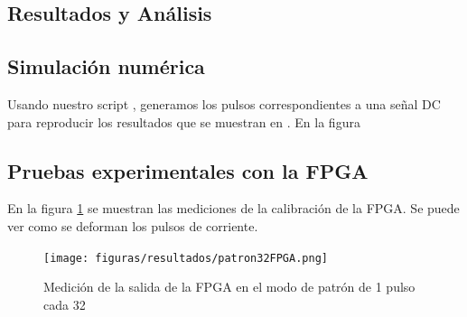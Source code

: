 \documentclass[twoside]{article}
\begin{document}
\begin{multicols}{2}
\section{Resultados y Análisis}

    \subsection{Simulación numérica}

    Usando nuestro script \cite{script}, generamos los pulsos correspondientes a una señal DC para reproducir los resultados que se muestran en \cite{aziz1996}. En la figura 

    \subsection{Pruebas experimentales con la FPGA}

    En la figura \ref{fig:resultados_patron32FPGA} se muestran las mediciones de la calibración de la FPGA. Se puede ver como se deforman los pulsos de corriente.

    \begin{figure}[H]
        \centering
        \texttt{[image: figuras/resultados/patron32FPGA.png]}
        \caption{Medición de la salida de la FPGA en el modo de patrón de 1 pulso cada 32}
        \label{fig:resultados_patron32FPGA}
    \end{figure}



\end{multicols}





\nocite{*} %
\end{document}
